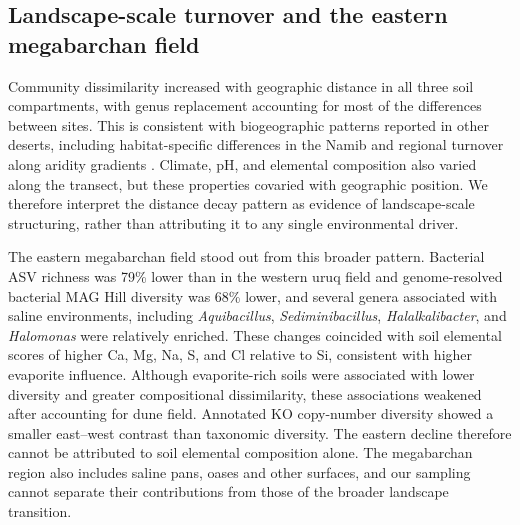 \documentclass[fleqn,10pt,numbers]{olplainarticle}
\begin{document}
\subsection*{Landscape-scale turnover and the eastern megabarchan field}
Community dissimilarity increased with geographic distance in all three soil compartments, with genus replacement accounting for most of the differences between sites. This is consistent with biogeographic patterns reported in other deserts, including habitat-specific differences in the Namib \cite{ronca2015namib} and regional turnover along aridity gradients \cite{neilson2017significant}. Climate, pH, and elemental composition also varied along the transect, but these properties covaried with geographic position. We therefore interpret the distance decay pattern as evidence of landscape-scale structuring, rather than attributing it to any single environmental driver.

The eastern megabarchan field stood out from this broader pattern. Bacterial ASV richness was 79\% lower than in the western uruq field and genome-resolved bacterial MAG Hill diversity was 68\% lower, and several genera associated with saline environments, including \textit{Aquibacillus}, \textit{Sediminibacillus}, \textit{Halalkalibacter}, and \textit{Halomonas} were relatively enriched. These changes coincided with soil elemental scores of higher Ca, Mg, Na, S, and Cl relative to Si, consistent with higher evaporite influence. Although evaporite-rich soils were associated with lower diversity and greater compositional dissimilarity, these associations weakened after accounting for dune field. Annotated KO copy-number diversity showed a smaller east--west contrast than taxonomic diversity. The eastern decline therefore cannot be attributed to soil elemental composition alone. The megabarchan region also includes saline pans, oases and other surfaces, and our sampling cannot separate their contributions from those of the broader landscape transition.

\end{document}
